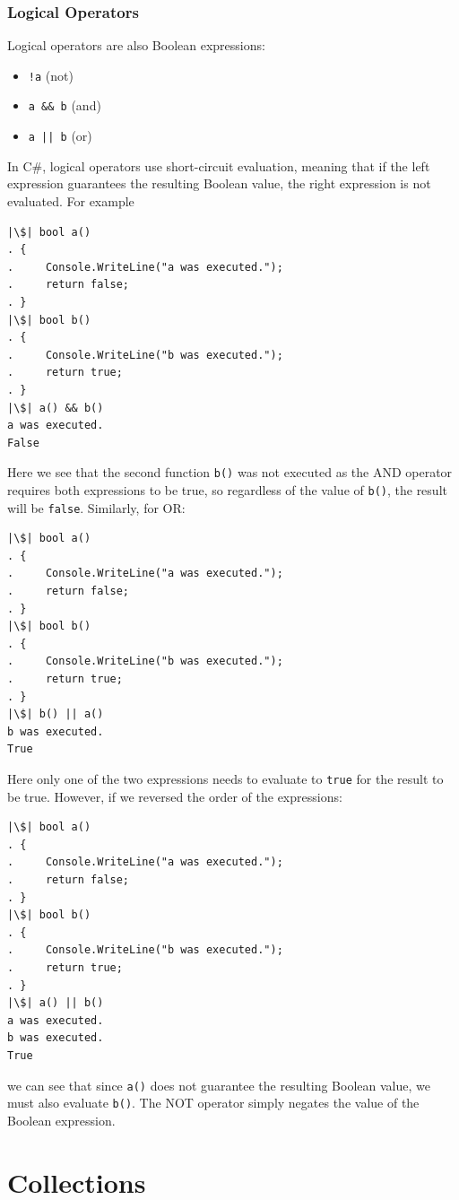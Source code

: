 \documentclass{article}
\begin{document}
\subsubsection{Logical Operators}
Logical operators are also Boolean expressions:
\begin{itemize}
    \item \texttt{!a} (not)
    \item \texttt{a && b} (and)
    \item \texttt{a || b} (or)
\end{itemize}
In C\#, logical operators use short-circuit evaluation, meaning that
if the left expression guarantees the resulting Boolean value,
the right expression is not evaluated. For example
\begin{verbatim}
|\$| bool a()
. {
.     Console.WriteLine("a was executed.");
.     return false;
. }
|\$| bool b()
. {
.     Console.WriteLine("b was executed.");
.     return true;
. }
|\$| a() && b()
a was executed.
False
\end{verbatim}
Here we see that the second function \texttt{b()} was not
executed as the {\ttfamily AND} operator requires both expressions to
be true, so regardless of the value of \texttt{b()}, the
result will be \texttt{false}. Similarly, for {\ttfamily
OR}:
\begin{verbatim}
|\$| bool a()
. {
.     Console.WriteLine("a was executed.");
.     return false;
. }
|\$| bool b()
. {
.     Console.WriteLine("b was executed.");
.     return true;
. }
|\$| b() || a()
b was executed.
True
\end{verbatim}
Here only one of the two expressions needs to evaluate to
\texttt{true} for the result to be true. However, if we
reversed the order of the expressions:
\begin{verbatim}
|\$| bool a()
. {
.     Console.WriteLine("a was executed.");
.     return false;
. }
|\$| bool b()
. {
.     Console.WriteLine("b was executed.");
.     return true;
. }
|\$| a() || b()
a was executed.
b was executed.
True
\end{verbatim}
we can see that since \texttt{a()} does not guarantee the
resulting Boolean value, we must also evaluate
\texttt{b()}. The {\ttfamily NOT} operator simply negates
the value of the Boolean expression.
\section{Collections}
\end{document}
